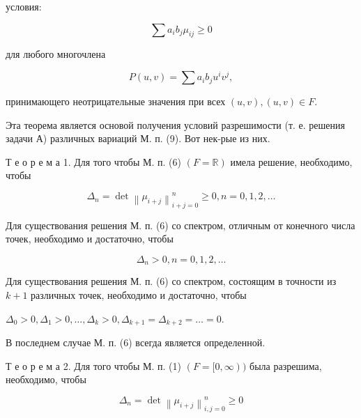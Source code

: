 \documentclass[10pt]{article}
\begin{document}
условия:



\[

\sum a_{i} b_{j} \mu_{i j} \geqslant 0

\]



для любого многочлена



\[

P(u, v)=\sum a_{i} b_{j} u^{i} v^{j},

\]



принимающего неотрицательные значения при всех $(u, v),(u, v) \in F$.



Эта теорема является основой получения условий разрешимости (т. е. решения задачи А) различных вариаций М. п. (9). Вот нек-рые из них.



Т е о р е м а 1. Для того чтобы М. п. (6) $(F=\mathbb{R})$ имела решение, необходимо, чтобы



\[

\Delta_{n}=\operatorname{det}\left\|\mu_{i+j}\right\|_{i+j=0}^{n} \geqslant 0, n=0,1,2, \ldots

\]



Для существования решения М. п. (6) со спектром, отличным от конечного числа точек, необходимо и достаточно, чтобы



\[

\Delta_{n}>0, n=0,1,2, \ldots

\]



Для существования решения М. п. (6) со спектром, состоящим в точности из $k+1$ различных точек, необходимо и достаточно, чтобы



$\Delta_{0}>0, \Delta_{1}>0, \ldots, \Delta_{k}>0, \Delta_{k+1}=\Delta_{k+2}=\ldots=0$.



В последнем случае М. п. (6) всегда является определенной.



Т е о р е м а 2. Для того чтобы М. п. (1) $(F=[0, \infty))$ была разрешима, необходимо, чтобы



\[

\Delta_{n}=\operatorname{det}\left\|\mu_{i+j}\right\|_{i, j=0}^{n} \geqslant 0

\]
\end{document}
